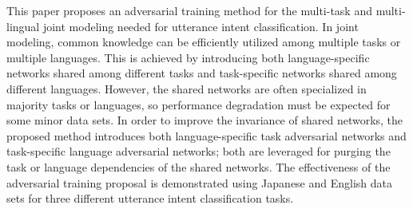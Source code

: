 This paper proposes an adversarial training method for the multi-task and multi-lingual joint modeling needed for utterance intent classification. In joint modeling, common knowledge can be efficiently utilized among multiple tasks or multiple languages. This is achieved by introducing both language-specific networks shared among different tasks and task-specific networks shared among different languages. However, the shared networks are often specialized in majority tasks or languages, so performance degradation must be expected for some minor data sets. In order to improve the invariance of shared networks, the proposed method introduces both language-specific task adversarial networks and task-specific language adversarial networks; both are leveraged for purging the task or language dependencies of the shared networks. The effectiveness of the adversarial training proposal is demonstrated using Japanese and English data sets for three different utterance intent classification tasks.
